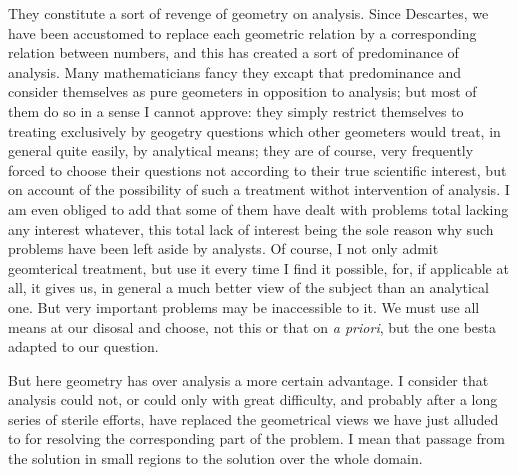 \documentclass[12pt,oneside]{book}
\begin{document}
They constitute a sort of revenge of geometry on analysis. Since Descartes, we have been accustomed to replace each geometric relation by a corresponding relation between numbers, and this has created a sort of predominance of analysis. Many mathematicians fancy they excapt that predominance and consider themselves as pure geometers in opposition to analysis; but most of them do so in a sense I cannot approve: they simply restrict themselves to treating exclusively by geogetry questions which other geometers would treat, in general quite easily, by analytical means; they are of course, very frequently forced to choose their questions not according to their true scientific interest, but on account of the possibility of such a treatment withot intervention of analysis. I am even obliged to add that some of them have dealt with problems total lacking any interest whatever, this total lack of interest being the sole reason why such problems have been left aside by analysts. Of course, I not only admit geomterical treatment, but use it every time I find it possible, for, if applicable at all, it gives us, in general a much better view of the subject than an analytical one. But very important problems may be inaccessible to it. We must use all means at our disosal and choose, not this or that on \textit{a priori}, but the one besta adapted to our question. \par

But here geometry has over analysis a more certain advantage. I consider that analysis could not, or could only with great difficulty, and probably after a long series of sterile efforts, have replaced the geometrical views we have just alluded to for resolving the corresponding part of the problem. I mean that passage from the solution in small regions to the solution over the whole domain.\footnotemark \par

\end{document}
